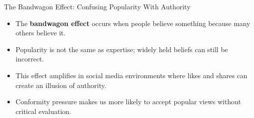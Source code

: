 \documentclass{beamer}
\begin{document}
\begin{frame}{The Bandwagon Effect: Confusing Popularity With Authority}
    \begin{itemize}
        \item The \textbf{bandwagon effect} occurs when people believe something because many others believe it.
        \item Popularity is not the same as expertise; widely held beliefs can still be incorrect.
        \item This effect amplifies in social media environments where likes and shares can create an illusion of authority.
        \item Conformity pressure makes us more likely to accept popular views without critical evaluation.
    \end{itemize}
    
\end{frame}
\end{document}
